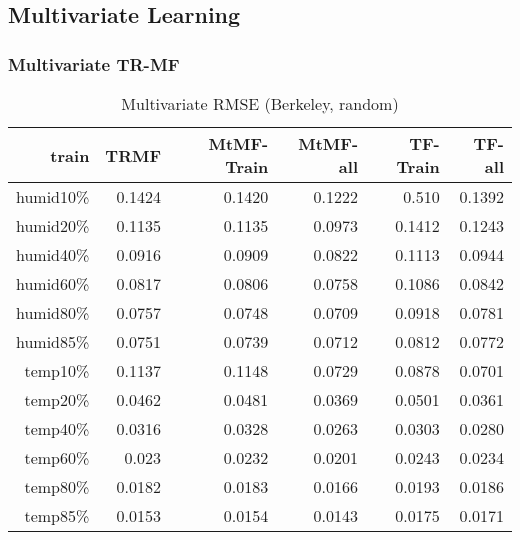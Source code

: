 \subsection{Multivariate Learning}
\subsubsection{Multivariate TR-MF}

\begin{table}[htbp]
\setlength{\tabcolsep}{2pt}
\centering
\caption{Multivariate RMSE (Berkeley, random)}
\label{table:multi_berkeley_random}
\begin{tabular}{r | r r r r r}
train	&TRMF	&MtMF-Train	&MtMF-all &TF-Train & TF-all \\ \hline
humid10\%	&0.1424	&0.1420	&0.1222 &0.510&0.1392\\
humid20\%	&0.1135	&0.1135	&0.0973&0.1412&0.1243\\
humid40\%	&0.0916	&0.0909	&0.0822&0.1113&0.0944\\
humid60\%	&0.0817	&0.0806	&0.0758&0.1086&0.0842\\
humid80\%	&0.0757	&0.0748	&0.0709&0.0918&0.0781\\
humid85\%	&0.0751	&0.0739	&0.0712&0.0812&0.0772\\ \hline
 temp10\%	&0.1137	&0.1148	&0.0729&0.0878&0.0701\\
 temp20\%	&0.0462	&0.0481	&0.0369&0.0501&0.0361\\
 temp40\%	&0.0316	&0.0328	&0.0263&0.0303&0.0280\\
 temp60\%	&0.023	&0.0232	&0.0201&0.0243&0.0234\\
 temp80\%	&0.0182	&0.0183	&0.0166&0.0193&0.0186\\
 temp85\%	&0.0153	&0.0154	&0.0143&0.0175&0.0171\\
\end{tabular}
\end{table}


